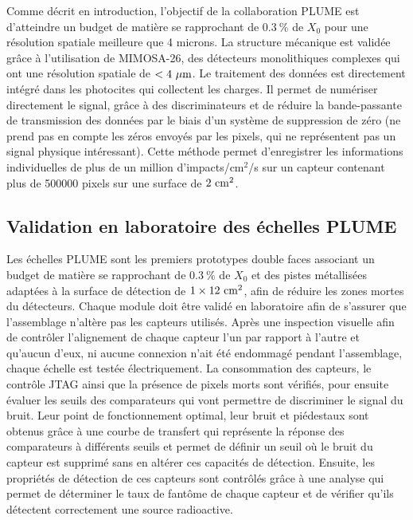     Comme décrit en introduction, l'objectif de la collaboration PLUME est d'atteindre un budget de matière se rapprochant de $0.3~\%$ de $X_0$ pour une résolution spatiale meilleure que 4 microns.
  La structure mécanique est validée grâce à l'utilisation de MIMOSA-26, des détecteurs monolithiques complexes qui ont une résolution spatiale de $< 4~\mu\rm{m}$.
  Le traitement des données est directement intégré dans les photocites qui collectent les charges. 
  Il permet de numériser directement le signal, grâce à des discriminateurs et de réduire la bande-passante de transmission des données par le biais d'un système de suppression de zéro (ne prend pas en compte les zéros envoyés par les pixels, qui ne représentent pas un signal physique intéressant).
  Cette méthode permet d'enregistrer les informations individuelles de plus de un million d'impacts/cm$^2$/s sur un capteur contenant plus de 500000 pixels sur une surface de $2~\rm{cm}^2$.
  
   \subsection{Validation en laboratoire des échelles PLUME}

  Les échelles PLUME sont les premiers prototypes double faces associant un budget de matière se rapprochant de $0.3~\%$ de $X_0$ et des pistes métallisées adaptées à la surface de détection de $1 \times 12~\rm{cm}^2$, afin de réduire les zones mortes du détecteurs. 
  Chaque module doit être validé en laboratoire afin de s'assurer que l'assemblage n'altère pas les capteurs utilisés.
  Après une inspection visuelle afin de contrôler l'alignement de chaque capteur l'un par rapport à l'autre et qu'aucun d'eux, ni aucune connexion n'ait été endommagé pendant l'assemblage, chaque échelle est testée électriquement.
  La consommation des capteurs, le contrôle JTAG ainsi que la présence de pixels morts sont vérifiés, pour ensuite évaluer les seuils des comparateurs qui vont permettre de discriminer le signal du bruit.
  Leur point de fonctionnement optimal, leur bruit et piédestaux sont obtenus grâce à une courbe de transfert qui représente la réponse des comparateurs à différents seuils et permet de définir un seuil où le bruit du capteur est supprimé sans en altérer ces capacités de détection.
  Ensuite, les propriétés de détection de ces capteurs sont contrôlés grâce à une analyse qui permet de déterminer le taux de fantôme de chaque capteur et de vérifier qu'ils détectent correctement une source radioactive.
  
